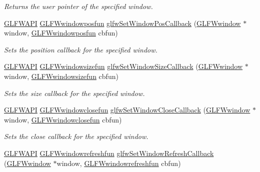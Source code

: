 \begin{DoxyCompactItemize}
\begin{DoxyCompactList}\small\item\em Returns the user pointer of the specified window. \end{DoxyCompactList}\item 
\mbox{\hyperlink{glfw3_8h_a56da5036b2cc259351ae22fd6439bb47}{G\+L\+F\+W\+A\+PI}} \mbox{\hyperlink{group__window_gafd8db81fdb0e850549dc6bace5ed697a}{G\+L\+F\+Wwindowposfun}} \mbox{\hyperlink{group__window_gaea610899c4cb070dcd655c6de1fe1d2c}{glfw\+Set\+Window\+Pos\+Callback}} (\mbox{\hyperlink{group__window_ga3c96d80d363e67d13a41b5d1821f3242}{G\+L\+F\+Wwindow}} $\ast$window, \mbox{\hyperlink{group__window_gafd8db81fdb0e850549dc6bace5ed697a}{G\+L\+F\+Wwindowposfun}} cbfun)
\begin{DoxyCompactList}\small\item\em Sets the position callback for the specified window. \end{DoxyCompactList}\item 
\mbox{\hyperlink{glfw3_8h_a56da5036b2cc259351ae22fd6439bb47}{G\+L\+F\+W\+A\+PI}} \mbox{\hyperlink{group__window_gae49ee6ebc03fa2da024b89943a331355}{G\+L\+F\+Wwindowsizefun}} \mbox{\hyperlink{group__window_ga150dad5f364425916c5816074cffa5e7}{glfw\+Set\+Window\+Size\+Callback}} (\mbox{\hyperlink{group__window_ga3c96d80d363e67d13a41b5d1821f3242}{G\+L\+F\+Wwindow}} $\ast$window, \mbox{\hyperlink{group__window_gae49ee6ebc03fa2da024b89943a331355}{G\+L\+F\+Wwindowsizefun}} cbfun)
\begin{DoxyCompactList}\small\item\em Sets the size callback for the specified window. \end{DoxyCompactList}\item 
\mbox{\hyperlink{glfw3_8h_a56da5036b2cc259351ae22fd6439bb47}{G\+L\+F\+W\+A\+PI}} \mbox{\hyperlink{group__window_ga93e7c2555bd837f4ed8b20f76cada72e}{G\+L\+F\+Wwindowclosefun}} \mbox{\hyperlink{group__window_ga5b827da350141c789acd64f5c4f7a0e1}{glfw\+Set\+Window\+Close\+Callback}} (\mbox{\hyperlink{group__window_ga3c96d80d363e67d13a41b5d1821f3242}{G\+L\+F\+Wwindow}} $\ast$window, \mbox{\hyperlink{group__window_ga93e7c2555bd837f4ed8b20f76cada72e}{G\+L\+F\+Wwindowclosefun}} cbfun)
\begin{DoxyCompactList}\small\item\em Sets the close callback for the specified window. \end{DoxyCompactList}\item 
\mbox{\hyperlink{glfw3_8h_a56da5036b2cc259351ae22fd6439bb47}{G\+L\+F\+W\+A\+PI}} \mbox{\hyperlink{group__window_ga7a56f9e0227e2cd9470d80d919032e08}{G\+L\+F\+Wwindowrefreshfun}} \mbox{\hyperlink{group__window_ga9d2621fbc271a0cdc0ce91f9749f46e3}{glfw\+Set\+Window\+Refresh\+Callback}} (\mbox{\hyperlink{group__window_ga3c96d80d363e67d13a41b5d1821f3242}{G\+L\+F\+Wwindow}} $\ast$window, \mbox{\hyperlink{group__window_ga7a56f9e0227e2cd9470d80d919032e08}{G\+L\+F\+Wwindowrefreshfun}} cbfun)

\end{DoxyCompactItemize}
